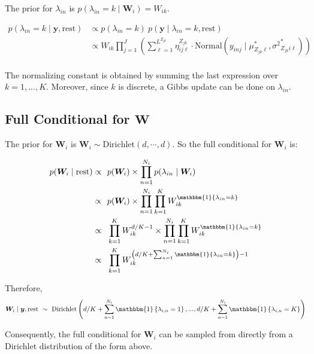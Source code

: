 \documentclass[12pt,]{article}
\newcommand{\p}[1]{\left(#1\right)}
\newcommand{\bc}[1]{ \left\{#1\right\} }
\newcommand{\N}{ \mathcal{N} }
\def\N{\text{Normal}}
\def\Dir{\text{Dirichlet}}
\def\lin{\lambda_{in}}
\def\y{\bm{y}}
\def\mus{\mu^*}
\def\sss{{\sigma^2}^*}
\newcommand{\Ind}[1]{\mathbbm{1}\bc{#1}}
\def\rest{\text{rest}}
\begin{document}
The prior for \(\lin\) is \(p(\lin = k \mid \bm W_i) = W_{ik}\).

\begin{align*}
p(\lin=k\mid \y,\rest) &\propto p(\lin=k) ~ p(\y \mid \lin=k, \rest) \\
&\propto W_{ik}
\prod_{j=1}^J 
\p{
  \sum_{\ell=1}^{L^{Z_{jk}}} \eta^{Z_{jk}}_{ij\ell} \cdot
  \N(y_{inj} \mid 
  \mus_{Z_{jk}\ell}, \sss_{Z_{jk}i\ell})
}\\
\end{align*}

The normalizing constant is obtained by summing the last expression over
\(k = 1,...,K\). Moreover, since \(k\) is discrete, a Gibbs update can
be done on \(\lin\).

\subsection{\texorpdfstring{Full Conditional for
\(\bm W\)}{Full Conditional for \textbackslash{}bm W}}\label{full-conditional-for-bm-w}

The prior for \(\bm{W}_i\) is \(\bm W_i \sim \Dir(d, \cdots, d)\). So
the full conditional for \(\bm{W}_i\) is:

\begin{align*}
p(\bm W_i \mid \rest) \propto&~~ p(\bm{W}_i) \times \prod_{n=1}^{N_i} p(\lin \mid \bm{W}_i)\\
\propto&~~ p(\bm{W}_i) \times \prod_{n=1}^{N_i}\prod_{k=1}^K W_{ik}^{\Ind{\lin=k}}\\
\propto&~~ \prod_{k=1}^K W_{ik}^{d/K-1} \times \prod_{n=1}^{N_i}\prod_{k=1}^K W_{ik}^{\Ind{\lin=k}}\\
\propto&~~ \prod_{k=1}^K W_{ik}^{\p{d/K + \sum_{n=1}^{N_i}\Ind{\lin=k}}-1}\\
%
\end{align*}

Therefore, \[
\bm{W}_i \mid \y,\rest ~\sim~ \Dir\p{d/K+\sum_{n=1}^{N_i}\Ind{\lambda_{i,n}=1},...,d/K+\sum_{n=1}^{N_i}\Ind{\lambda_{i,n}=K}} 
\]

Consequently, the full conditional for \(\bm{W}_i\) can be sampled from
directly from a Dirichlet distribution of the form above.
\end{document}
